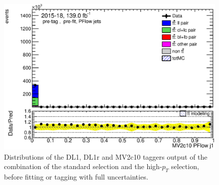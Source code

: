 \documentclass[letterpaper,12pt]{article}
\begin{document}
\begin{figure}[H]
\begin{minipage}[b]{.45\textwidth}
	\includegraphics[width=1\textwidth]{Oct_distributions/pretagNoRwDL1rwithhighpTPFlow_scaledall/DataMC_J1_MV2c10.eps}
	\end{minipage}
	\caption{Distributions of the DL1, DL1r and MV2c10 
	taggers output of the combination 
	of the standard selection and the high-$p_T$ selection, 
	before fitting or tagging with full uncertainties.} \label{fig:taggers_PFlow}
\end{figure}
\end{document}
